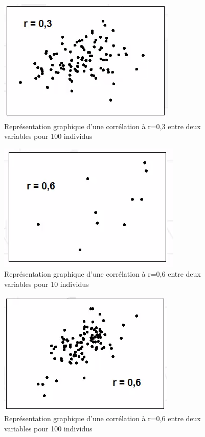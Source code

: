 \begin{figure}[H]\begin{center}\includegraphics[scale=0.4]{ilu/bv.png}\caption{Représentation graphique d'une corrélation à r=0,3 entre deux variables pour 100 individus}\end{center}\end{figure}
\begin{figure}[H]\begin{center}\includegraphics[scale=0.4]{ilu/bt.png}\caption{Représentation graphique d'une corrélation à r=0,6 entre deux variables pour 10 individus}\end{center}\end{figure}
\begin{figure}[H]\begin{center}\includegraphics[scale=0.4]{ilu/bw.png}\caption{Représentation graphique d'une corrélation à r=0,6 entre deux variables pour 100 individus}\end{center}\end{figure}

